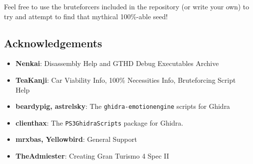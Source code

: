 \documentclass[12pt,a4paper,notitlepage]{extarticle}
\begin{document}
            Feel free to use the bruteforcers included in the repository (or write your own) to
            try and attempt to find that mythical 100\%-able seed!

        \subsection*{Acknowledgements}
            \small{
                \begin{itemize}
                    \item \textbf{Nenkai}: Disassembly Help and GTHD Debug Executables Archive
                    \item \textbf{TeaKanji}: Car Viability Info, 100\% Necessities Info,
                    Bruteforcing Script Help
                    \item \textbf{beardypig, astrelsky}: The \texttt{ghidra-emotionengine} scripts
                    for Ghidra
                    \item \textbf{clienthax}: The \texttt{PS3GhidraScripts} package for Ghidra.
                    \item \textbf{mrxbas, Yellowbird}: General Support
                    \item \textbf{TheAdmiester}: Creating Gran Turismo 4 Spec II
                \end{itemize}
            }
\end{document}
